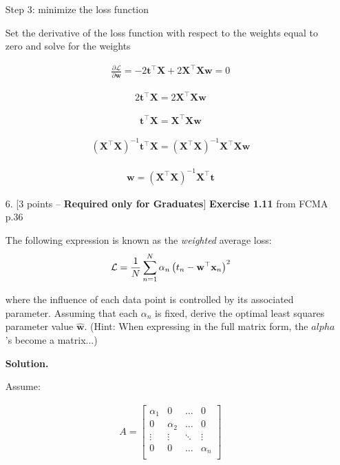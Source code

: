 \documentclass[10pt]{article}
\begin{document}
\begin{itemize}
Step 3: minimize the loss function

Set the derivative of the loss function with respect to the weights equal to zero and solve for the weights

\begin{eqnarray*}
\frac{\partial \mathcal{L}}{\partial \mathbf{w}} =
- 2\mathbf{t}^\top \mathbf{X} + 2\mathbf{X}^\top \mathbf{X} \mathbf{w} = 0
\end{eqnarray*}

\begin{eqnarray*}
2\mathbf{t}^\top \mathbf{X} = 2\mathbf{X}^\top \mathbf{X} \mathbf{w}
\end{eqnarray*}

\begin{eqnarray*}
\mathbf{t}^\top \mathbf{X} = \mathbf{X}^\top \mathbf{X} \mathbf{w}
\end{eqnarray*}

\begin{eqnarray*}
(\mathbf{X}^\top \mathbf{X})^{-1} \mathbf{t}^\top \mathbf{X} = (\mathbf{X}^\top \mathbf{X})^{-1} \mathbf{X}^\top \mathbf{X} \mathbf{w}
\end{eqnarray*}

\begin{eqnarray*}
\mathbf{w} =
(\mathbf{X}^\top \mathbf{X})^{-1} \mathbf{X}^\top \mathbf{t}
\end{eqnarray*}

\item[6.] [3 points -- {\bf Required only for Graduates}]
{\bf Exercise 1.11} from FCMA p.36

The following expression is known as the {\em weighted} average loss:
\begin{eqnarray*}
\mathcal{L} = {1 \over N} \sum_{n=1}^N \alpha_n \left( t_n - \mathbf{w}^\top \mathbf{x}_n \right)^2
\end{eqnarray*}

where the influence of each data point is controlled by its associated parameter.  Assuming that each $\alpha_n$ is fixed, derive the optimal least squares parameter value $\mathbf{\hat{w}}$.  (Hint: When expressing in the full matrix form, the $alpha$'s become a matrix...)

{\bf Solution.} 

Assume:

\begin{eqnarray*}
A = 
\begin{bmatrix}
    \alpha_1 & 0 & \dots & 0\\[0.3em]
    0 & \alpha_2 & \dots & 0\\[0.3em]
    \vdots & \vdots & \ddots & \vdots\\[0.3em]
    0 & 0 & \dots & \alpha_n\\[0.3em]
\end{bmatrix}
\end{eqnarray*}


\end{itemize}
\end{document}
